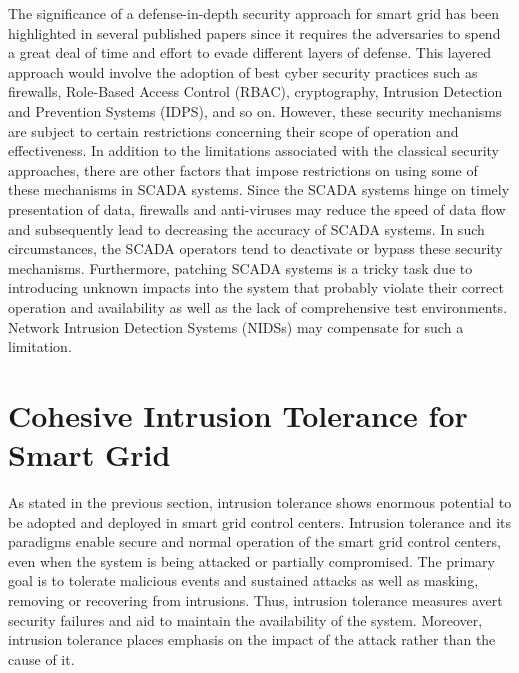 \documentclass[preprint,number,12pt]{elsarticle}
\begin{document}
The significance of a defense-in-depth security approach for smart grid has been highlighted in several published papers\citep{Seo2011,Overman2011c,Amin2012,Ericsson2010} since it requires the adversaries to spend a great deal of time and effort to evade different layers of defense. This layered approach would involve the adoption of best cyber security practices such as firewalls, Role-Based Access Control (RBAC), cryptography, Intrusion Detection and Prevention Systems (IDPS), and so on. However, these security mechanisms are subject to certain restrictions concerning their scope of operation and effectiveness. In addition to the limitations associated with the classical security approaches, there are other factors that impose restrictions on using some of these mechanisms in SCADA systems. Since the SCADA systems hinge on timely presentation of data, firewalls and anti-viruses may reduce the speed of data flow and subsequently lead to decreasing the accuracy of SCADA systems. In such circumstances, the SCADA operators tend to deactivate or bypass these security mechanisms. Furthermore, patching SCADA systems is a tricky task due to introducing unknown impacts into the system that probably violate their correct operation and availability as well as the lack of comprehensive test environments. Network Intrusion Detection Systems (NIDSs) may compensate for such a limitation\citep{Nicholson2012418}.
\section {Cohesive Intrusion Tolerance for Smart Grid}
\label{sec: intrusion tolerance for smart grid}
As stated in the previous section, intrusion tolerance shows enormous potential to be adopted and deployed in smart grid control centers. Intrusion tolerance and its paradigms enable secure and normal operation of the smart grid control centers, even when the system is being attacked or partially compromised. The primary goal is to tolerate malicious events and sustained attacks as well as masking, removing or recovering from intrusions. Thus, intrusion tolerance measures avert security failures and aid to maintain the availability of the system. Moreover, intrusion tolerance places emphasis on the impact of the attack rather than the cause of it.
\end{document}

